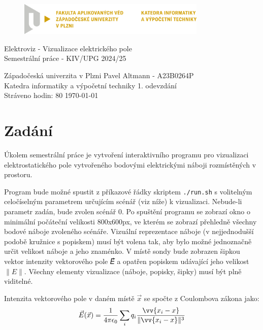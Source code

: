 \documentclass[12pt]{article}
\newcommand{\code}[1]{\mbox{\texttt{#1}}}
\begin{document}
\begin{figure}[H]
	\centering
	\includegraphics[width=0.8\textwidth]{pic/LOGO_KIV_CMYK.png}
\end{figure}

\begin{center}
	\vspace{.5cm}
	\LARGE{Elektroviz - Vizualizace elektrického pole}\\
	\large{Semestrální práce - KIV/UPG 2024/25}
\end{center}

\vfill

\noindent
Západočeská univerzita v Plzni \hfill Pavel Altmann - A23B0264P\\
Katedra informatiky a výpočetní techniky \hfill 1. odevzdání\\
Stráveno hodin: 80 \hfill \today
\thispagestyle{empty}

\newpage
\setcounter{page}{1}

\tableofcontents

\newpage

\section{Zadání}

Úkolem semestrální práce je vytvoření interaktivního programu pro vizualizaci
elektrostatického pole vytvořeného bodovými elektrickými náboji rozmístěných
v prostoru.

Program bude možné spustit z příkazové řádky skriptem \code{./run.sh} s volitelným
celočíselným parametrem určujícím scénář (viz níže) k vizualizaci. Nebude-li
parametr zadán, bude zvolen scénář 0. Po spuštění programu se zobrazí okno
o minimální počáteční velikosti 800x600px, ve kterém se zobrazí přehledně
všechny bodové náboje zvoleného scénáře. Vizuální reprezentace náboje
(v nejjednodušší podobě kružnice s popiskem) musí být volena tak, aby bylo možné
jednoznačně určit velikost náboje a jeho znaménko. V místě sondy bude zobrazen
šipkou vektor intenzity vektorového pole 𝐸⃗ a opatřen popiskem udávající jeho
velikost $\|E\|$. Všechny elementy vizualizace (náboje, popisky, šipky) musí být
plně viditelné.

Intenzita vektorového pole v daném místě $\vec{x}$ se spočte
z Coulombova zákona jako:
\[ \vec{E}(\vec{x}) = \frac{1}{4 \pi \epsilon_0}
\sum_i q_i \frac{\vv{x_i - x}}{\|\vv{x_i - x}\|^3} \]
\end{document}

